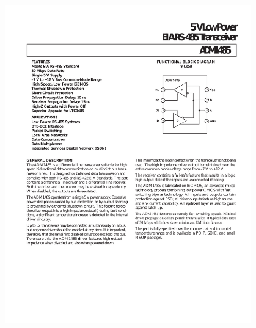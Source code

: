 \documentclass[russian, utf8, 12pt]{eskdtext}
\begin{document}
\ESKDappendix{}{}
\begin{figure} [h!]
	\centering
	\includegraphics[width = 0.95\textwidth]{ADM1485-1.pdf}
\end{figure}
\end{document}
